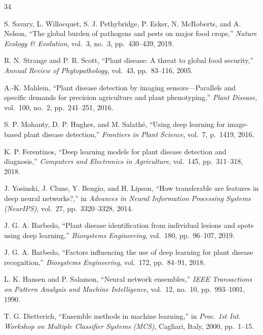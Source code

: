 \documentclass[conference]{IEEEtran}
\begin{document}
\begin{thebibliography}{34}

S. Savary, L. Willocquet, S. J. Pethybridge, P. Esker, N. McRoberts, and A. Nelson, ``The global burden of pathogens and pests on major food crops,'' \textit{Nature Ecology \& Evolution}, vol.~3, no.~3, pp.~430--439, 2019.

R. N. Strange and P. R. Scott, ``Plant disease: A threat to global food security,'' \textit{Annual Review of Phytopathology}, vol.~43, pp.~83--116, 2005.

A.-K. Mahlein, ``Plant disease detection by imaging sensors---Parallels and specific demands for precision agriculture and plant phenotyping,'' \textit{Plant Disease}, vol.~100, no.~2, pp.~241--251, 2016.

S. P. Mohanty, D. P. Hughes, and M. Salath\'{e}, ``Using deep learning for image-based plant disease detection,'' \textit{Frontiers in Plant Science}, vol.~7, p.~1419, 2016.

K. P. Ferentinos, ``Deep learning models for plant disease detection and diagnosis,'' \textit{Computers and Electronics in Agriculture}, vol.~145, pp.~311--318, 2018.

J. Yosinski, J. Clune, Y. Bengio, and H. Lipson, ``How transferable are features in deep neural networks?,'' in \textit{Advances in Neural Information Processing Systems (NeurIPS)}, vol.~27, pp.~3320--3328, 2014.

J. G. A. Barbedo, ``Plant disease identification from individual lesions and spots using deep learning,'' \textit{Biosystems Engineering}, vol.~180, pp.~96--107, 2019.

J. G. A. Barbedo, ``Factors influencing the use of deep learning for plant disease recognition,'' \textit{Biosystems Engineering}, vol.~172, pp.~84--91, 2018.

L. K. Hansen and P. Salamon, ``Neural network ensembles,'' \textit{IEEE Transactions on Pattern Analysis and Machine Intelligence}, vol.~12, no.~10, pp.~993--1001, 1990.

T. G. Dietterich, ``Ensemble methods in machine learning,'' in \textit{Proc. 1st Int. Workshop on Multiple Classifier Systems (MCS)}, Cagliari, Italy, 2000, pp.~1--15.


\end{thebibliography}
\end{document}
